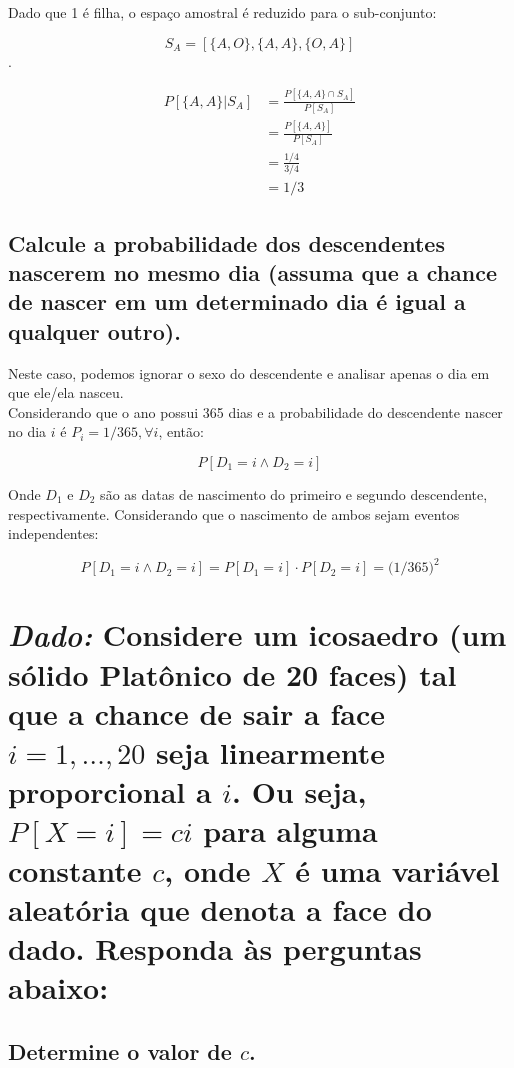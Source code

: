 \documentclass[a4paper]{article}
\begin{document}
Dado que 1 é filha, o espaço amostral é reduzido para o sub-conjunto: 

$$S_A = [\{A, O\}, \{A, A\}, \{O, A\}]$$.

\begin{equation}
    \begin{split}
        P[\{A, A\} | S_A] &= \frac{P[\{A, A\} \cap S_A]}{P[S_A]} \\
            &= \frac{P[\{A, A\}]}{P[S_A]} \\
            &= \frac{1/4}{3/4} \\
            &= 1/3
    \end{split}
\end{equation}

\subsection{Calcule a probabilidade dos descendentes nascerem no mesmo dia (assuma que a chance de nascer em um determinado dia é igual a qualquer outro).}

Neste caso, podemos ignorar o sexo do descendente e analisar apenas o dia em que ele/ela nasceu. \\

Considerando que o ano possui 365 dias e a probabilidade do descendente nascer no dia $i$ é $P_i = 1/365, \forall i$, então: 

$$P[D_1 = i \wedge D_2 = i]$$

Onde $D_1$ e $D_2$ são as datas de nascimento do primeiro e segundo descendente, respectivamente. Considerando que o nascimento de ambos sejam eventos independentes: 

$$P[D_1 = i \wedge D_2 = i] = P[D_1 = i] \cdot P[D_2 = i] = \Big( 1/365 \Big)^2$$


\section{\textit{Dado:} Considere um icosaedro (um sólido Platônico de 20 faces) tal que a chance de sair a face $i = 1, \ldots, 20$ seja linearmente proporcional a $i$. Ou seja, $P[X = i] = ci$ para alguma constante $c$, onde $X$ é uma variável aleatória que denota a face do dado. Responda às perguntas abaixo:}

\subsection{Determine o valor de $c$.}
\end{document}
